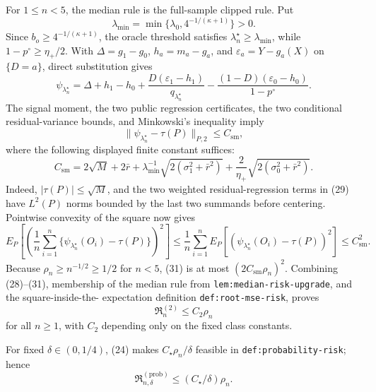 For \(1\leq n<5\), the median rule is the full-sample clipped rule.  Put
\[
\lambda_{\min}=\min\{\lambda_0,4^{-1/(\kappa+1)}\}>0.
\]
Since \(b_o\geq4^{-1/(\kappa+1)}\), the oracle threshold satisfies
\(\lambda_n^\star\geq\lambda_{\min}\), while
\(1-p^\circ\geq\eta_+/2\).  With
\(\Delta=g_1-g_0\), \(h_a=m_a-g_a\), and
\(\varepsilon_a=Y-g_a(X)\) on \(\{D=a\}\), direct substitution gives
\[
\psi_{\lambda_n^\star}
=\Delta+h_1-h_0
+\frac{D(\varepsilon_1-h_1)}{q_{\lambda_n^\star}}
-\frac{(1-D)(\varepsilon_0-h_0)}{1-p^\circ}.                       \tag{29}
\]
The signal moment, the two public regression certificates, the two conditional
residual-variance bounds, and Minkowski's inequality imply
\[
\|\psi_{\lambda_n^\star}-\tau(P)\|_{P,2}\leq C_{\mathrm{sm}},      \tag{30}
\]
where the following displayed finite constant suffices:
\[
C_{\mathrm{sm}}
=2\sqrt M+2\bar r
+\lambda_{\min}^{-1}\sqrt{2(\sigma_1^2+\bar r^2)}
+\frac2{\eta_+}\sqrt{2(\sigma_0^2+\bar r^2)}.
\]
Indeed, \(|\tau(P)|\leq\sqrt M\), and the two weighted residual-regression
terms in (29) have \(L^2(P)\) norms bounded by the last two summands before
centering.  Pointwise convexity of the square now gives
\[
E_P\!\left[\left(\frac1n\sum_{i=1}^n
\{\psi_{\lambda_n^\star}(O_i)-\tau(P)\}\right)^2\right]
\leq\frac1n\sum_{i=1}^n
E_P[(\psi_{\lambda_n^\star}(O_i)-\tau(P))^2]
\leq C_{\mathrm{sm}}^2.                                           \tag{31}
\]
Because \(\rho_n\geq n^{-1/2}\geq1/2\) for \(n<5\), (31) is at most
\((2C_{\mathrm{sm}}\rho_n)^2\).  Combining (28)--(31), membership of the
median rule from \texttt{lem:median-risk-upgrade}, and the square-inside-the-
expectation definition \texttt{def:root-mse-risk}, proves
\[
\mathfrak R_n^{(2)}\leq C_2\rho_n                                  \tag{32}
\]
for all \(n\geq1\), with \(C_2\) depending only on the fixed class constants.

For fixed \(\delta\in(0,1/4)\), (24) makes
\(C_\star\rho_n/\delta\) feasible in
\texttt{def:probability-risk}; hence
\[
\mathfrak R_{n,\delta}^{(\mathrm{prob})}
\leq(C_\star/\delta)\rho_n.                                       \tag{33}
\]

